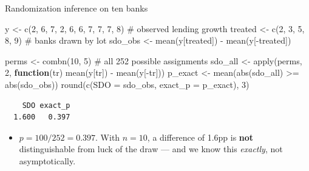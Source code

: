 \documentclass[
  11pt,
  ignorenonframetext,
  aspectratio=169,
]{beamer}
\newenvironment{Shaded}{\begin{snugshade}}{\end{snugshade}}
\newcommand{\AttributeTok}[1]{\textcolor[rgb]{0.40,0.45,0.13}{#1}}
\newcommand{\CommentTok}[1]{\textcolor[rgb]{0.37,0.37,0.37}{#1}}
\newcommand{\ControlFlowTok}[1]{\textcolor[rgb]{0.00,0.23,0.31}{\textbf{#1}}}
\newcommand{\DecValTok}[1]{\textcolor[rgb]{0.68,0.00,0.00}{#1}}
\newcommand{\FunctionTok}[1]{\textcolor[rgb]{0.28,0.35,0.67}{#1}}
\newcommand{\NormalTok}[1]{\textcolor[rgb]{0.00,0.23,0.31}{#1}}
\newcommand{\OtherTok}[1]{\textcolor[rgb]{0.00,0.23,0.31}{#1}}
\newcommand{\SpecialCharTok}[1]{\textcolor[rgb]{0.37,0.37,0.37}{#1}}
\providecommand{\tightlist}{%
  \setlength{\itemsep}{0pt}\setlength{\parskip}{0pt}}
\begin{document}
\begin{frame}[fragile]{Randomization inference on ten banks}
\protect{}\label{randomization-inference-on-ten-banks}
\begin{Shaded}
\begin{Highlighting}[]
\NormalTok{y }\OtherTok{\textless{}{-}} \FunctionTok{c}\NormalTok{(}\DecValTok{2}\NormalTok{, }\DecValTok{6}\NormalTok{, }\DecValTok{7}\NormalTok{, }\DecValTok{2}\NormalTok{, }\DecValTok{6}\NormalTok{, }\DecValTok{6}\NormalTok{, }\DecValTok{7}\NormalTok{, }\DecValTok{7}\NormalTok{, }\DecValTok{7}\NormalTok{, }\DecValTok{8}\NormalTok{)     }\CommentTok{\# observed lending growth}
\NormalTok{treated }\OtherTok{\textless{}{-}} \FunctionTok{c}\NormalTok{(}\DecValTok{2}\NormalTok{, }\DecValTok{3}\NormalTok{, }\DecValTok{5}\NormalTok{, }\DecValTok{8}\NormalTok{, }\DecValTok{9}\NormalTok{)              }\CommentTok{\# banks drawn by lot}
\NormalTok{sdo\_obs }\OtherTok{\textless{}{-}} \FunctionTok{mean}\NormalTok{(y[treated]) }\SpecialCharTok{{-}} \FunctionTok{mean}\NormalTok{(y[}\SpecialCharTok{{-}}\NormalTok{treated])}

\NormalTok{perms }\OtherTok{\textless{}{-}} \FunctionTok{combn}\NormalTok{(}\DecValTok{10}\NormalTok{, }\DecValTok{5}\NormalTok{)                     }\CommentTok{\# all 252 possible assignments}
\NormalTok{sdo\_all }\OtherTok{\textless{}{-}} \FunctionTok{apply}\NormalTok{(perms, }\DecValTok{2}\NormalTok{, }\ControlFlowTok{function}\NormalTok{(tr) }\FunctionTok{mean}\NormalTok{(y[tr]) }\SpecialCharTok{{-}} \FunctionTok{mean}\NormalTok{(y[}\SpecialCharTok{{-}}\NormalTok{tr]))}
\NormalTok{p\_exact }\OtherTok{\textless{}{-}} \FunctionTok{mean}\NormalTok{(}\FunctionTok{abs}\NormalTok{(sdo\_all) }\SpecialCharTok{\textgreater{}=} \FunctionTok{abs}\NormalTok{(sdo\_obs))}
\FunctionTok{round}\NormalTok{(}\FunctionTok{c}\NormalTok{(}\AttributeTok{SDO =}\NormalTok{ sdo\_obs, }\AttributeTok{exact\_p =}\NormalTok{ p\_exact), }\DecValTok{3}\NormalTok{)}
\end{Highlighting}
\end{Shaded}

\begin{verbatim}
    SDO exact_p 
  1.600   0.397 
\end{verbatim}

\begin{itemize}
\tightlist
\item
  \(p = 100/252 = 0.397\). With \(n = 10\), a difference of 1.6pp is
  \textbf{not} distinguishable from luck of the draw --- and we know
  this \emph{exactly}, not asymptotically.
\end{itemize}
\end{frame}
\end{document}
